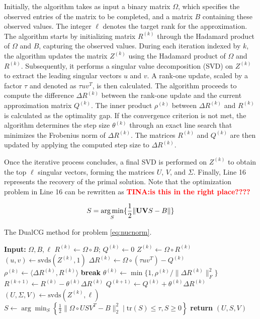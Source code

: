 \documentclass[10pt, twocolumn, reqno, a4paper,oneside]{amsart}
\numberwithin{equation}{section}
\numberwithin{theorem}{section}
\numberwithin{figure}{section}
\numberwithin{table}{section}
\numberwithin{theorem}{section}
\numberwithin{equation}{section}
\DeclareMathOperator*{\argmin}{arg\,min}
\begin{document}
Initially, the algorithm takes as input a binary matrix $\Omega$, which specifies the observed entries of the matrix to be completed, and a matrix $B$ containing these observed values. The integer $\ell$ denotes the target rank for the approximation. The algorithm starts by initializing matrix $R^{(k)}$ through the Hadamard product of $\Omega$ and $B$, capturing the observed values.
During each iteration indexed by $k$, the algorithm updates the matrix $Z^{(k)}$ using the Hadamard product of $\Omega$ and $R^{(k)}$. Subsequently, it performs a singular value decomposition (SVD) on $Z^{(k)}$ to extract the leading singular vectors $u$ and $v$. A rank-one update, scaled by a factor $\tau$ and denoted as $\tau u v^T$, is then calculated.
The algorithm proceeds to compute the difference $\Delta R^{(k)}$ between the rank-one update and the current approximation matrix $Q^{(k)}$. The inner product $\rho^{(k)}$ between $\Delta R^{(k)}$ and $R^{(k)}$ is calculated as the optimality gap.
If the convergence criterion is not met, the algorithm determines the step size $\theta^{(k)}$ through an exact line search that minimizes the Frobenius norm of $\Delta R^{(k)}$. The matrices $R^{(k)}$ and $Q^{(k)}$ are then updated by applying the computed step size to $\Delta R^{(k)}$.

Once the iterative process concludes, a final SVD is performed on $Z^{(k)}$ to obtain the top $\ell$ singular vectors, forming the matrices $U$, $V$, and $\Sigma$.
Finally, Line 16 represents the recovery of the primal solution.
Note that the optimization problem in Line 16 can be rewritten as \textcolor{red}{ \textbf{TINA:is this in the right place????}}


\begin{equation}
	S = \argmin_S \{ \frac{1}{2}\| \vb{UV} S - B \|\}
\end{equation}
\begin{algorithm}
	\caption{The DualCG method for problem \eqref{eq:nucnorm}.}\label{alg:dualCG}
	\begin{algorithmic}[1]
		\State \textbf{Input:} $\Omega, B, \ell$
		\State $R^{(k)} \gets \Omega \circ B$; $Q^{(k)} \gets 0$
		\State $Z^{(k)} \gets \Omega \circ R^{(k)}$
		\State $(u, v) \gets \text{svds}(Z^{(k)}, 1)$
		\State $\Delta R^{(k)} \gets \Omega \circ (\tau u v^T) - Q^{(k)}$
		\State $\rho^{(k)} \gets \langle \Delta R^{(k)}, R^{(k)} \rangle$ 
		\State \textbf{break}
		\EndIf
		\State $\theta^{(k)} \gets \min\{1, \rho^{(k)} / \|\Delta R^{(k)}\|_F^2\}$
		\State $R^{(k+1)} \gets R^{(k)} - \theta^{(k)} \Delta R^{(k)}$
		\State $Q^{(k+1)} \gets Q^{(k)} + \theta^{(k)} \Delta R^{(k)}$
		\EndFor
		\State $(U, \Sigma, V) \gets \text{svds}(Z^{(k)}, \ell)$ 
		\State $S \gets \arg\min_S \left\{\frac{1}{2}\|\Omega \circ U S V^T - B\|_2^2 \mid \text{tr}(S) \leq \tau, S \geq 0\right\}$
		\State \textbf{return} $(U, S, V)$ \label{eq:algocfmc}
	\end{algorithmic}
\end{algorithm}
\end{document}
